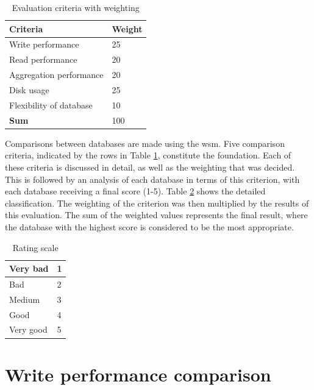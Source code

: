 \begin{table}[hbt!]
\centering
\begin{tabular}{@{}ll@{}}
\toprule
\textbf{Criteria}       & \textbf{Weight} \\ \midrule
Write performance       & 25              \\
Read performance        & 20              \\
Aggregation performance & 20              \\
Disk usage              & 25              \\
Flexibility of database & 10              \\ \hline
\textbf{Sum}          & 100             \\ \bottomrule
\end{tabular}
\caption{Evaluation criteria with weighting}
\label{tab:evaluation_weight}
\end{table}

Comparisons between databases are made using the \ac{wsm}. Five comparison criteria, indicated by the rows in Table \ref{tab:evaluation_weight}, constitute the foundation. Each of these criteria is discussed in detail, as well as the weighting that was decided. This is followed by an analysis of each database in terms of this criterion, with each database receiving a final score (1-5). Table \ref{tab:rating_scale} shows the detailed classification. The weighting of the criterion was then multiplied by the results of this evaluation. The sum of the weighted values represents the final result, where the database with the highest score is considered to be the most appropriate.

\begin{table}[hbt!]
\centering
\begin{tabular}{|l|l|}
\hline
Very bad  & 1 \\ \hline
Bad       & 2 \\ \hline
Medium    & 3 \\ \hline
Good      & 4 \\ \hline
Very good & 5 \\ \hline
\end{tabular}
\caption{Rating scale}
\label{tab:rating_scale}
\end{table}

\section{Write performance comparison}

